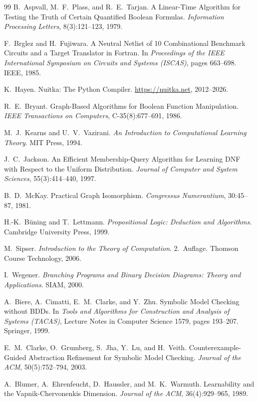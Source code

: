 ﻿\documentclass[a4paper,12pt]{article}
\theoremstyle{definition}
\begin{document}
\begin{thebibliography}{99}
B.\ Aspvall, M.\ F.\ Plass, and R.\ E.\ Tarjan. A Linear-Time Algorithm for Testing the Truth of Certain Quantified Boolean Formulas. \textit{Information Processing Letters}, 8(3):121--123, 1979.

F.\ Brglez and H.\ Fujiwara. A Neutral Netlist of 10 Combinational Benchmark Circuits and a Target Translator in Fortran. In \textit{Proceedings of the IEEE International Symposium on Circuits and Systems (ISCAS)}, pages 663--698. IEEE, 1985.

K.\ Hayen. Nuitka: The Python Compiler. \url{https://nuitka.net}, 2012--2026.

R.\ E.\ Bryant. Graph-Based Algorithms for Boolean Function Manipulation. \textit{IEEE Transactions on Computers}, C-35(8):677--691, 1986.

M.\ J.\ Kearns and U.\ V.\ Vazirani. \textit{An Introduction to Computational Learning Theory}. MIT Press, 1994.

J.\ C.\ Jackson. An Efficient Membership-Query Algorithm for Learning DNF with Respect to the Uniform Distribution. \textit{Journal of Computer and System Sciences}, 55(3):414--440, 1997.

B.\ D.\ McKay. Practical Graph Isomorphism. \textit{Congressus Numerantium}, 30:45--87, 1981.

H.-K.\ Büning and T.\ Lettmann. \textit{Propositional Logic: Deduction and Algorithms}. Cambridge University Press, 1999.

M.\ Sipser. \textit{Introduction to the Theory of Computation}. 2.\ Auflage. Thomson Course Technology, 2006.

I.\ Wegener. \textit{Branching Programs and Binary Decision Diagrams: Theory and Applications}. SIAM, 2000.

A.\ Biere, A.\ Cimatti, E.\ M.\ Clarke, and Y.\ Zhu. Symbolic Model Checking without BDDs. In \textit{Tools and Algorithms for Construction and Analysis of Systems (TACAS)}, Lecture Notes in Computer Science 1579, pages 193--207. Springer, 1999.

E.\ M.\ Clarke, O.\ Grumberg, S.\ Jha, Y.\ Lu, and H.\ Veith. Counterexample-Guided Abstraction Refinement for Symbolic Model Checking. \textit{Journal of the ACM}, 50(5):752--794, 2003.

A.\ Blumer, A.\ Ehrenfeucht, D.\ Haussler, and M.\ K.\ Warmuth. Learnability and the Vapnik-Chervonenkis Dimension. \textit{Journal of the ACM}, 36(4):929--965, 1989.

\end{thebibliography}
\end{document}

